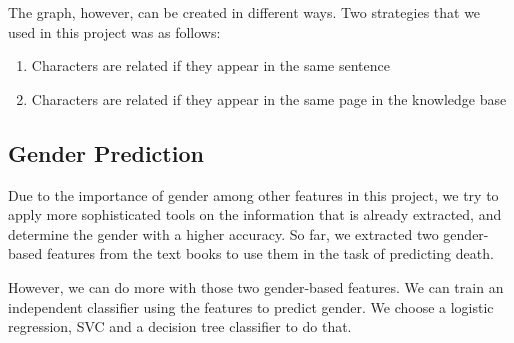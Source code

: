 \documentclass[letterpaper]{article}
\begin{document}
The graph, however, can be created in different ways. Two strategies that we used in this project was as follows:
\begin{enumerate}[label=\alph*.]
	\item Characters are related if they appear in the same sentence
	\item Characters are related if they appear in the same page in the knowledge base
\end{enumerate}


\subsection{Gender Prediction}

Due to the importance of gender among other features in this project, we try to apply more sophisticated tools on the information that is already extracted, and determine the gender with a higher accuracy. So far, we extracted two gender-based features from the text books to use them in the task of predicting death.

However, we can do more with those two gender-based features. We can train an independent classifier using the features to predict gender. We choose a logistic regression, SVC and a decision tree classifier to do that.






\end{document}
